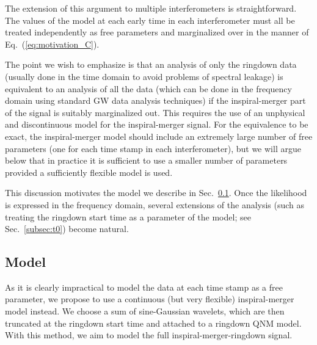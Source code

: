 The extension of this argument to multiple interferometers is straightforward. 
The values of the model at each early time in each interferometer must all be treated independently as free parameters and marginalized over in the manner of Eq.~(\ref{eq:motivation_C}).

The point we wish to emphasize is that an analysis of only the ringdown data (usually done in the time domain to avoid problems of spectral leakage) is equivalent to an analysis of all the data (which can be done in the frequency domain using standard GW data analysis techniques) if the inspiral-merger part of the signal is suitably marginalized out. 
This requires the use of an unphysical and discontinuous model for the inspiral-merger signal.
For the equivalence to be exact, the inspiral-merger model should include an extremely large number of free parameters (one for each time stamp in each interferometer), but we will argue below that in practice it is sufficient to use a smaller number of parameters provided a sufficiently flexible model is used.

This discussion motivates the model we describe in Sec.~\ref{subsec:model}. Once the likelihood is expressed in the frequency domain, several extensions of the analysis (such as treating the ringdown start time as a parameter of the model; see Sec.~\ref{subsec:t0}) become natural.


\subsection{Model}\label{subsec:model}

As it is clearly impractical to model the data at each time stamp as a free parameter, we propose to use a continuous (but very flexible) inspiral-merger model instead. 
We choose a sum of sine-Gaussian wavelets, which are then truncated at the ringdown start time and attached to a ringdown QNM model. 
With this method, we aim to model the full inspiral-merger-ringdown signal.


